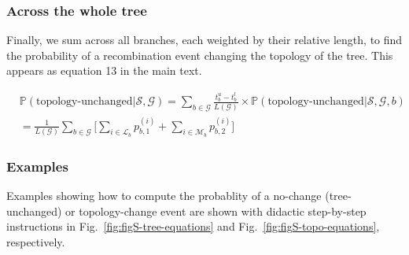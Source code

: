 \documentclass[11pt]{article}
\begin{document}
\subsubsection{Across the whole tree}

Finally, we sum across all branches, each weighted by their relative length, 
to find the probability of a recombination event changing the 
topology of the tree. This appears as equation 13 in the main text.

\begin{equation}\tag{13}
\begin{aligned}
    &\mathbb{P}(\text{topology-unchanged}| \mathcal{S}, \mathcal{G}) = 
    \sum_{b \in \mathcal{G}}
    \frac{t_b^u - t_b^l}
    {L(\mathcal{G})} \times \mathbb{P}(\text{topology-unchanged}| \mathcal{S}, \mathcal{G}, b) \\
    & = \frac{1}{L(\mathcal{G})} \sum_{b \in \mathcal{G}}
     \bigg[ 
	    \sum_{i \in \mathcal{L}_b} p_{b,1}^{(i)} + 
	    \sum_{i \in \mathcal{M}_b} p_{b,2}^{(i)}
	\bigg]
\end{aligned}
\end{equation}


\subsubsection{Examples}
Examples showing how to compute the probablity of a no-change (tree-unchanged) 
or topology-change event are shown with didactic step-by-step instructions in 
Fig.~\ref{fig:figS-tree-equations} and Fig.~\ref{fig:figS-topo-equations}, 
respectively.
\end{document}
